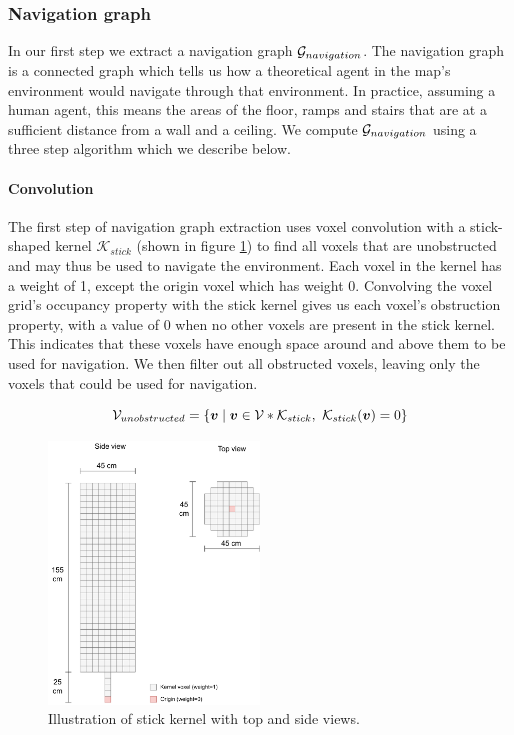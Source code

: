 \subsubsection{Navigation graph}
In our first step we extract a navigation graph \(\mathcal{G}_{navigation}\). The navigation graph is a connected graph which tells us how a theoretical agent in the map's environment would navigate through that environment. In practice, assuming a human agent, this means the areas of the floor, ramps and stairs that are at a sufficient distance from a wall and a ceiling. We compute \(\mathcal{G}_{navigation}\) using a three step algorithm which we describe below.

\paragraph{Convolution}
The first step of navigation graph extraction uses voxel convolution with a stick-shaped kernel \(\mathcal{K}_{stick}\) (shown in figure \ref{fig:stick_kernel}) to find all voxels that are unobstructed and may thus be used to navigate the environment. Each voxel in the kernel has a weight of 1, except the origin voxel which has weight 0. Convolving the voxel grid's occupancy property with the stick kernel gives us each voxel's obstruction property, with a value of 0 when no other voxels are present in the stick kernel. This indicates that these voxels have enough space around and above them to be used for navigation. We then filter out all obstructed voxels, leaving only the voxels that could be used for navigation.

\begin{equation}
    \label{eq:convolve}
\mathcal{V}_{unobstructed}=\{\boldsymbol{v} \mid \boldsymbol{v} \in \mathcal{V} * \mathcal{K}_{stick},\ \mathcal{K}_{stick}(\boldsymbol{v}) = 0\}
\end{equation}

\begin{figure}[h]
    \centering
    \includegraphics*[width=0.5\textwidth]{./fig/structuring_element.drawio.pdf}
    \caption{Illustration of stick kernel with top and side views.}
    \label{fig:stick_kernel}
\end{figure}

